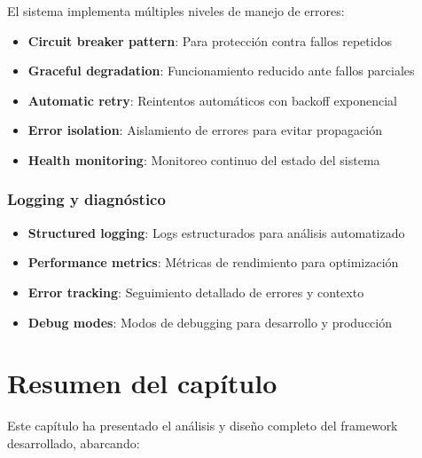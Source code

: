 El sistema implementa múltiples niveles de manejo de errores:

\begin{itemize}
    \item \textbf{Circuit breaker pattern}: Para protección contra fallos repetidos
    \item \textbf{Graceful degradation}: Funcionamiento reducido ante fallos parciales
    \item \textbf{Automatic retry}: Reintentos automáticos con backoff exponencial
    \item \textbf{Error isolation}: Aislamiento de errores para evitar propagación
    \item \textbf{Health monitoring}: Monitoreo continuo del estado del sistema
\end{itemize}

\subsubsection{Logging y diagnóstico}

\begin{itemize}
    \item \textbf{Structured logging}: Logs estructurados para análisis automatizado
    \item \textbf{Performance metrics}: Métricas de rendimiento para optimización
    \item \textbf{Error tracking}: Seguimiento detallado de errores y contexto
    \item \textbf{Debug modes}: Modos de debugging para desarrollo y producción
\end{itemize}

\section{Resumen del capítulo}
\label{sec:resumen_analisis_diseno}

Este capítulo ha presentado el análisis y diseño completo del framework desarrollado, abarcando:


